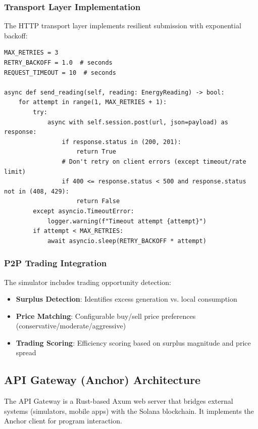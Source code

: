 \documentclass[conference]{IEEEtran}
\begin{document}
\subsubsection{Transport Layer Implementation}

The HTTP transport layer implements resilient submission with exponential backoff:

\begin{lstlisting}[caption={HTTP Transport Retry Logic}]
MAX_RETRIES = 3
RETRY_BACKOFF = 1.0  # seconds
REQUEST_TIMEOUT = 10  # seconds

async def send_reading(self, reading: EnergyReading) -> bool:
    for attempt in range(1, MAX_RETRIES + 1):
        try:
            async with self.session.post(url, json=payload) as response:
                if response.status in (200, 201):
                    return True
                # Don't retry on client errors (except timeout/rate limit)
                if 400 <= response.status < 500 and response.status not in (408, 429):
                    return False
        except asyncio.TimeoutError:
            logger.warning(f"Timeout attempt {attempt}")
        if attempt < MAX_RETRIES:
            await asyncio.sleep(RETRY_BACKOFF * attempt)
\end{lstlisting}

\subsubsection{P2P Trading Integration}

The simulator includes trading opportunity detection:
\begin{itemize}
    \item \textbf{Surplus Detection}: Identifies excess generation vs. local consumption
    \item \textbf{Price Matching}: Configurable buy/sell price preferences (conservative/moderate/aggressive)
    \item \textbf{Trading Scoring}: Efficiency scoring based on surplus magnitude and price spread
\end{itemize}

\subsection{API Gateway (Anchor) Architecture}

The API Gateway is a Rust-based Axum web server that bridges external systems (simulators, mobile apps) with the Solana blockchain. It implements the Anchor client for program interaction.
\end{document}
